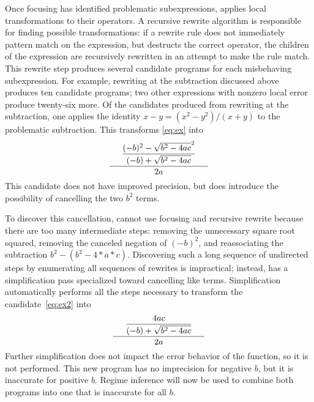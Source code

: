 \documentclass[paper.tex]{subfiles}
\begin{document}
Once focusing has identified problematic subexpressions, \casio
applies local transformations to their operators.  A recursive rewrite
algorithm is responsible for finding possible transformations: if a
rewrite rule does not immediately pattern match on the expression, but
destructs the correct operator, the children of the expression are
recursively rewritten in an attempt to make the rule match.  This
rewrite step produces several candidate programs for each misbehaving
subexpression.  For example, rewriting at the subtraction discussed
above produces ten candidate programs; two other expressions with
nonzero local error produce twenty-six more.  Of the candidates
produced from rewriting at the subtraction, one applies the identity
$x - y = (x^2 - y^2) / (x + y)$ to the problematic subtraction.  This
transforms \eqref{eq:ex} into
\begin{equation} \label{eq:ex2}
  \frac{\displaystyle\phantom{\hspace{0.5cm}}
    \frac{(-b)^2 - \sqrt{b^2 - 4ac}^2}
    {(-b) + \sqrt{b^2 - 4ac}}
    \phantom{\hspace{0.5cm}}
  }
       {2a}
\end{equation}
This candidate does not have improved precision, but does introduce
the possibility of cancelling the two $b^2$ terms.

To discover this cancellation, \casio cannot use focusing and
recursive rewrite because there are too many intermediate steps:
removing the unnecessary square root squared, removing the canceled
negation of $(-b)^2$, and reassociating the subtraction $b^2 - (b^2 -
4*a*c)$.  Discovering such a long sequence of undirected steps by
enumerating all sequences of rewrites is impractical; instead, \casio
has a simplification pass specialized toward cancelling like terms.
Simplification automatically performs all the steps necessary to
transform the candidate~\eqref{eq:ex2} into
\begin{equation} \label{eq:ex3}
  \frac{\displaystyle\phantom{\hspace{0.5cm}}
    \frac{4ac} {(-b) + \sqrt{b^2 - 4ac}}
    \phantom{\hspace{0.5cm}}
  } {2a}
\end{equation}
Further simplification does not impact the error behavior of the
function, so it is not performed.  This new program has no imprecision
for negative $b$, but it is inaccurate for positive $b$.  Regime
inference will now be used to combine both programs into one that is
inaccurate for all $b$.
\end{document}
